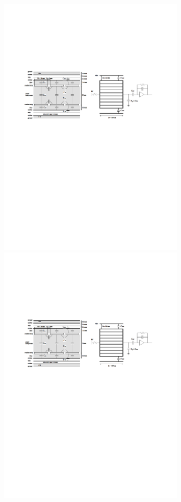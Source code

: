 \begin{figure}[tbp]
		\begin{minipage}{0.49\hsize}
		\centering
        \includegraphics[width=0.8\textwidth,page=3]{img/pdf/ASD.pdf}
        \subcaption{}
        \end{minipage}
        \begin{minipage}{0.49\hsize}
        \centering
        \includegraphics[width=0.8\textwidth,page=4]{img/pdf/ASD.pdf}

\end{minipage}
\end{figure}
